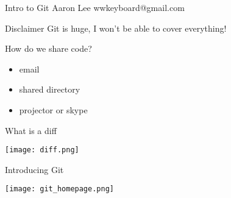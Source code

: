 \documentclass{beamer}
\begin{document}
\begin{frame}{Intro to Git}
Aaron Lee
wwkeyboard@gmail.com
\end{frame}

\begin{frame}{Disclaimer}
Git is huge, I won't be able to cover everything!
\end{frame}

\begin{frame}{How do we share code?}
  \begin{center}
    \begin{itemize}
      \item email
      \item shared directory
      \item projector or skype
    \end{itemize}
  \end{center}
\end{frame}

\begin{frame}{What is a diff}
  \begin{center}
    \texttt{[image: diff.png]}
  \end{center}
\end{frame}

\begin{frame}{Introducing Git\!}
  \begin{center}
    \texttt{[image: git\_homepage.png]}
  \end{center}
\end{frame}


\end{document}
